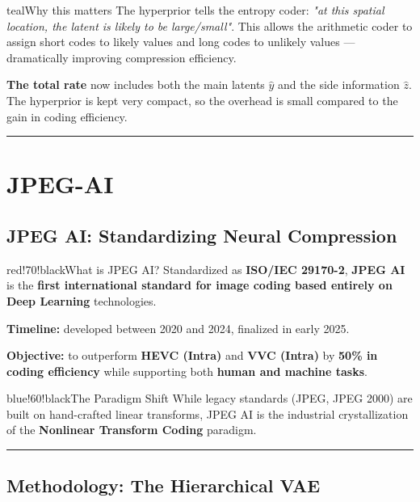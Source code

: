 \begin{calloutbox}{teal}{Why this matters}
The hyperprior tells the entropy coder: \textit{"at this spatial location, the latent is likely to be large/small"}. This allows the arithmetic coder to assign short codes to likely values and long codes to unlikely values — dramatically improving compression efficiency.

\textbf{The total rate} now includes both the main latents $\hat{y}$ and the side information $\hat{z}$. The hyperprior is kept very compact, so the overhead is small compared to the gain in coding efficiency.
\end{calloutbox}

\bigskip\hrule\bigskip

\section{JPEG-AI}

\subsection{JPEG AI: Standardizing Neural Compression}

\begin{calloutbox}{red!70!black}{What is JPEG AI?}
Standardized as \textbf{ISO/IEC 29170-2}, \textbf{JPEG AI} is the \textbf{first international standard for image coding based entirely on Deep Learning} technologies.

\textbf{Timeline:} developed between 2020 and 2024, finalized in early 2025.

\textbf{Objective:} to outperform \textbf{HEVC (Intra)} and \textbf{VVC (Intra)} by \textbf{50\% in coding efficiency} while supporting both \textbf{human and machine tasks}.
\end{calloutbox}

\begin{calloutbox}{blue!60!black}{The Paradigm Shift}
While legacy standards (JPEG, JPEG 2000) are built on hand-crafted linear transforms, JPEG AI is the industrial crystallization of the \textbf{Nonlinear Transform Coding} paradigm.
\end{calloutbox}

\bigskip\hrule\bigskip

\subsection{Methodology: The Hierarchical VAE}

